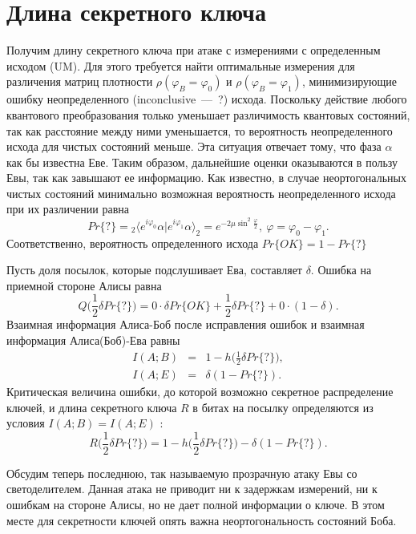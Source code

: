 \section{Длина секретного ключа}
Получим длину секретного ключа при атаке с измерениями с определенным исходом (UM). Для этого требуется найти оптимальные измерения для различения матриц плотности $\rho(\varphi_B = \varphi_0)$ и $\rho(\varphi_B = \varphi_1)$, минимизирующие ошибку неопределенного (inconclusive~---~?) исхода. 
Поскольку действие любого квантового преобразования только уменьшает различимость квантовых состояний, так как расстояние между ними уменьшается, то вероятность неопределенного исхода для чистых состояний меньше. Эта ситуация отвечает тому, что фаза $\alpha$ как бы известна Еве. Таким образом, дальнейшие оценки оказываются в пользу Евы, так как завышают ее информацию. 
Как известно, в случае неортогональных чистых состояний минимально возможная вероятность неопределенного исхода при их различении равна
\begin{equation*}
  Pr\{?\} = {}_2 \langle e^{i \varphi_0} \alpha | e^{i \varphi_1} \alpha \rangle_2 = e^{-2\mu\sin^2{\frac{\varphi}{2}}},~\varphi = \varphi_0 - \varphi_1.
\end{equation*}
Соответственно, вероятность определенного исхода $ Pr\{OK\} = 1 - Pr\{?\} $

Пусть доля посылок, которые подслушивает Ева, составляет $\delta$. Ошибка на приемной стороне Алисы равна
\begin{equation*}
  Q\bigg(\frac{1}{2}\delta Pr\{?\}\bigg) = 0 \cdot \delta Pr\{OK\} + \frac{1}{2}\delta Pr\{?\} + 0 \cdot (1 - \delta).
\end{equation*}
Взаимная информация Алиса-Боб после исправления ошибок и взаимная информация Алиса(Боб)-Ева равны
\begin{eqnarray*}
  I(A;B) &=& 1 - h\bigg(\frac{1}{2}\delta Pr\{?\}\bigg), \\
  I(A;E) &=& \delta(1 - Pr\{?\}).
\end{eqnarray*}
Критическая величина ошибки, до которой возможно секретное распределение ключей, и длина секретного ключа $R$ в битах на посылку определяются из условия $I(A;B) = I(A;E)$ \cite{renner2006SecQuaKeyDis}:
\begin{equation*}
  R\bigg(\frac{1}{2}\delta Pr\{?\}\bigg) = 1 - h\bigg(\frac{1}{2}\delta Pr\{?\}\bigg) - \delta(1 - Pr\{?\}).
\end{equation*}

Обсудим теперь последнюю, так называемую прозрачную атаку Евы со светоделителем. Данная атака не приводит ни к задержкам измерений, ни к ошибкам на стороне Алисы, но не дает полной информации о ключе. 
В этом месте для секретности ключей опять важна неортогональность состояний Боба.

